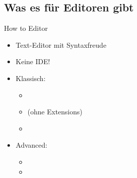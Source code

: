 \subsection{Was es für Editoren gibt}
\begin{frame}[t]{How to Editor}
    \begin{itemize}[<+(1)->]
        \itemsep16pt
        \item Text-Editor mit Syntaxfreude
        \item Keine IDE!
        \item Klassisch: \begin{itemize}
            \item {}\os{\faWindows, \x{\faApple}, \x{\faLinux}}
            \item {}\os{\faLinux, \faApple, \faWindows} (ohne Extensions)
            \item {}\os{\faLinux, \faApple, \faWindows}
        \end{itemize}
        \item Advanced: \begin{itemize}
            \item {}\os{\faLinux, \faApple, \x{\faWindows}}
            \item {}\os{\faLinux, \faApple, \x{\faWindows}}
        \end{itemize}
    \end{itemize}
\end{frame}

